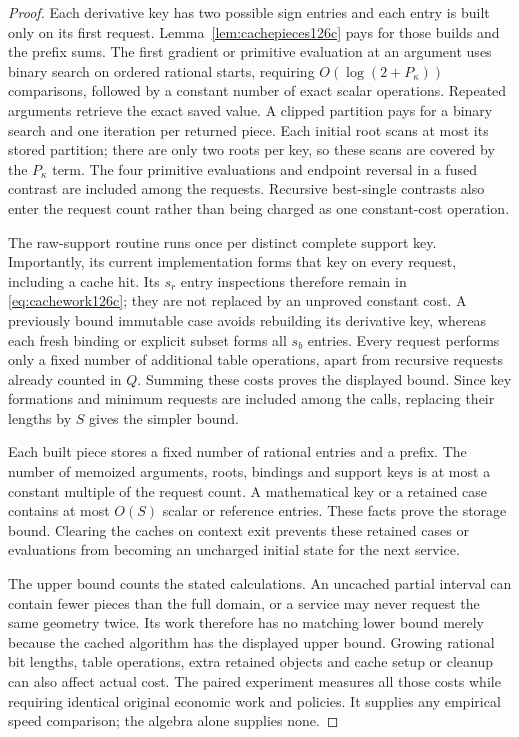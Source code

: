 \begin{proof}
Each derivative key has two possible sign entries and each entry is built
only on its first request.  Lemma~\ref{lem:cachepieces126c} pays for those
builds and the prefix sums.  The first gradient or primitive evaluation at
an argument uses binary search on ordered rational starts, requiring
$O(\log(2+P_\kappa))$ comparisons, followed by a constant number of
exact scalar operations.  Repeated arguments retrieve the exact saved
value.  A clipped partition pays for a binary search and one iteration per
returned piece.  Each initial root scans at most its stored partition;
there are only two roots per key, so these scans are covered by the
$P_\kappa$ term.  The four primitive evaluations and endpoint reversal
in a fused contrast are included among the requests.  Recursive
best-single contrasts also enter the request count rather than being
charged as one constant-cost operation.

The raw-support routine runs once per distinct complete support key.
Importantly, its current implementation forms that key on every request,
including a cache hit.  Its $s_r$ entry inspections therefore remain in
\eqref{eq:cachework126c}; they are not replaced by an unproved constant
cost.  A previously bound immutable case avoids rebuilding its derivative
key, whereas each fresh binding or explicit subset forms all $s_b$ entries.
Every request performs only a fixed number of additional table operations,
apart from recursive requests already counted in $Q$.  Summing these costs
proves the displayed bound.  Since key formations and minimum requests are
included among the calls, replacing their lengths by $S$ gives the simpler
bound.

Each built piece stores a fixed number of rational entries and a prefix.
The number of memoized arguments, roots, bindings and support keys is at
most a constant multiple of the request count.  A mathematical key or a
retained case contains at most $O(S)$ scalar or reference entries.  These
facts prove the storage bound.  Clearing the caches on context exit prevents
these retained cases or evaluations from becoming an uncharged initial state
for the next service.

The upper bound counts the stated calculations.  An uncached partial
interval can contain fewer pieces than the full domain, or a service may
never request the same geometry twice.  Its work therefore has no matching
lower bound merely because the cached algorithm has the displayed upper
bound.  Growing rational bit lengths, table operations, extra retained
objects and cache setup or cleanup can also affect actual cost.  The paired
experiment measures all those costs while requiring identical original
economic work and policies.  It supplies any empirical speed comparison;
the algebra alone supplies none.
\end{proof}
